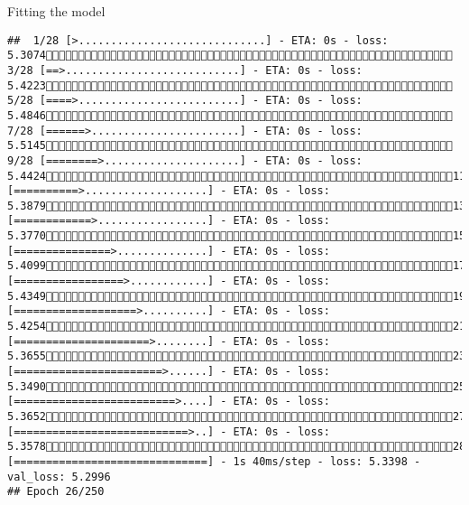 \documentclass[
  ignorenonframetext,
]{beamer}
\begin{document}
\begin{frame}[fragile]{Fitting the model}
\begin{verbatim}
##  1/28 [>.............................] - ETA: 0s - loss: 5.3074 3/28 [==>...........................] - ETA: 0s - loss: 5.4223 5/28 [====>.........................] - ETA: 0s - loss: 5.4846 7/28 [======>.......................] - ETA: 0s - loss: 5.5145 9/28 [========>.....................] - ETA: 0s - loss: 5.442411/28 [==========>...................] - ETA: 0s - loss: 5.387913/28 [============>.................] - ETA: 0s - loss: 5.377015/28 [===============>..............] - ETA: 0s - loss: 5.409917/28 [=================>............] - ETA: 0s - loss: 5.434919/28 [===================>..........] - ETA: 0s - loss: 5.425421/28 [=====================>........] - ETA: 0s - loss: 5.365523/28 [=======================>......] - ETA: 0s - loss: 5.349025/28 [=========================>....] - ETA: 0s - loss: 5.365227/28 [===========================>..] - ETA: 0s - loss: 5.357828/28 [==============================] - 1s 40ms/step - loss: 5.3398 - val_loss: 5.2996
## Epoch 26/250

\end{verbatim}
\end{frame}
\end{document}
